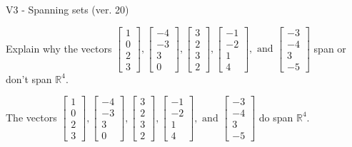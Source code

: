 \begin{exercise}
  \begin{exerciseTitle}V3 - Spanning sets (ver. 20)\end{exerciseTitle}
  \begin{exerciseStatement}
    Explain why the vectors \(\left[\begin{array}{r}
1 \\
0 \\
2 \\
3
\end{array}\right] , \left[\begin{array}{r}
-4 \\
-3 \\
3 \\
0
\end{array}\right] , \left[\begin{array}{r}
3 \\
2 \\
3 \\
2
\end{array}\right] , \left[\begin{array}{r}
-1 \\
-2 \\
1 \\
4
\end{array}\right] , \text{ and } \left[\begin{array}{r}
-3 \\
-4 \\
3 \\
-5
\end{array}\right]\) span or don't span \(\mathbb{R}^4\). 
	


  \end{exerciseStatement}
  \begin{exerciseAnswer}
   The vectors \(\left[\begin{array}{r}
1 \\
0 \\
2 \\
3
\end{array}\right] , \left[\begin{array}{r}
-4 \\
-3 \\
3 \\
0
\end{array}\right] , \left[\begin{array}{r}
3 \\
2 \\
3 \\
2
\end{array}\right] , \left[\begin{array}{r}
-1 \\
-2 \\
1 \\
4
\end{array}\right] , \text{ and } \left[\begin{array}{r}
-3 \\
-4 \\
3 \\
-5
\end{array}\right]\) 
  	 do  
	span \(\mathbb{R}^4\).
  


  \end{exerciseAnswer}
\end{exercise}